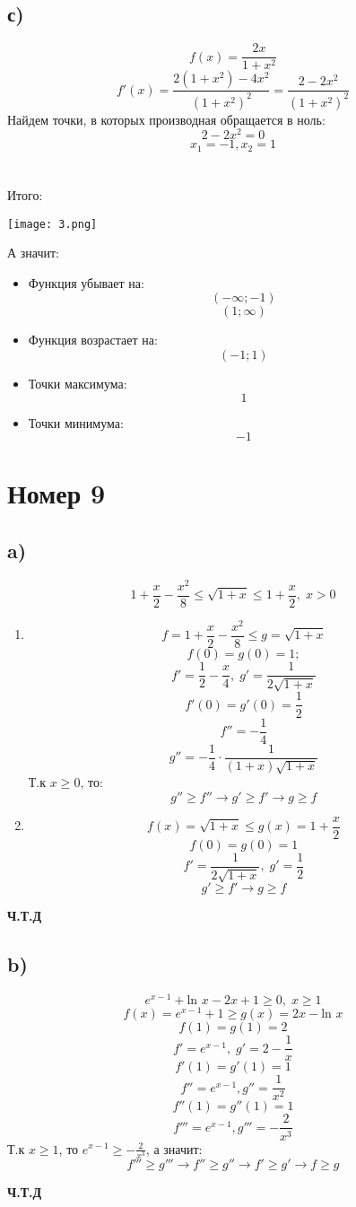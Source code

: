 \documentclass[a4paper,12pt]{article}
\begin{document}
\subsection*{с)}
\[
f(x) = \frac{2x}{1+x^2}
\]
\[
f'(x) = \frac{2(1+x^2) - 4x^2}{(1+x^2)^2} 
=
\frac{2-2x^2}{(1+x^2)^2}
\]
Найдем точки, в которых производная обращается в ноль:
\[
2 - 2x^2 = 0
\]
\[
x_1 = -1, x_2 = 1
\]
\\\\
Итого:
\begin{center}
\texttt{[image: 3.png]}
\end{center}
А значит:
\begin{itemize}
\item Функция убывает на:
\[
(-\infty; -1)
\]
\[
(1; \infty)
\]
\item Функция возрастает на:
\[
\left( -1 ; 1 \right)
\]

\item Точки максимума:
\[
1
\]
\item Точки минимума:
\[
-1
\]
\end{itemize}
\section*{Номер 9}
\subsection*{a)}
\[
1 + \frac{x}{2} - \frac{x^2}{8} \leq \sqrt{1+x} \leq 1 + \frac{x}{2}, \; x > 0
\]
\begin{enumerate}
\item
\[
f = 1 + \frac{x}{2} - \frac{x^2}{8} \leq g = \sqrt{1+x}
\]
\[
f(0) = g(0) = 1;
\]
\[
f' = \frac{1}{2} - \frac{x}{4}, \; g' = \frac{1}{2\sqrt{1+x}}
\]
\[
f'(0) = g'(0) = \frac{1}{2}
\]
\[
f'' = -\frac{1}{4}
\]
\[
g'' = -\frac{1}{4} \cdot \frac{1}{(1+x)\sqrt{1+x}}
\]
Т.к $x \geq 0$, то:
\[
g'' \geq f'' \rightarrow g' \geq f' \rightarrow g \geq f
\]
\item
\[
f(x) = \sqrt{1+x} \leq g(x) =1 + \frac{x}{2}
\]
\[
f(0) = g(0) = 1
\]
\[
f' = \frac{1}{2\sqrt{1+x}}, \; g' = \frac{1}{2}
\]
\[
g' \geq f' \rightarrow g \geq f
\]
\end{enumerate}
\begin{center}
\textbf{Ч.Т.Д}
\end{center}
\subsection*{b)}
\[
e^{x-1} + \text{ln } x - 2x + 1 \geq 0, \; x \geq 1
\]
\[
f(x)= e^{x-1} +1 \geq g(x) = 2x - \text{ln } x
\]
\[
f(1) = g(1) = 2
\]
\[
f' = e^{x-1},\;  g' = 2 - \frac{1}{x}
\]
\[
f'(1) = g'(1) = 1
\]
\[
f'' = e^{x-1}, g'' = \frac{1}{x^2}
\]
\[
f''(1) = g''(1) = 1
\]
\[
f''' = e^{x-1}, g''' = -\frac{2}{x^3}
\]
Т.к $x \geq 1$, то $e^{x-1} \geq -\frac{2}{x^3}$, а значит:
\[
f''' \geq g''' \rightarrow f'' \geq g'' \rightarrow f' \geq g' \rightarrow f \geq g
\]
\begin{center}
\textbf{Ч.Т.Д}
\end{center}
\end{document}
